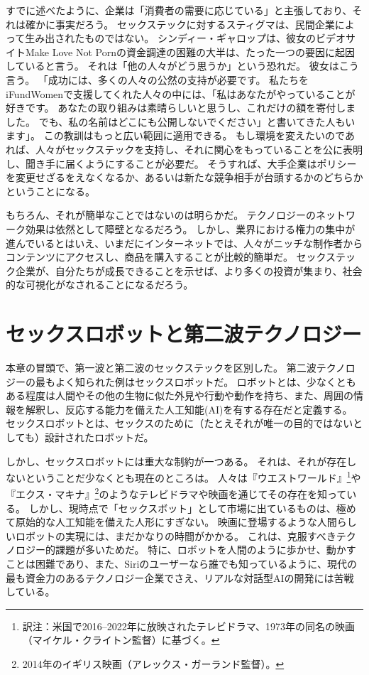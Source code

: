 \documentclass[paper=a4,book,openany]{jlreq} \usepackage{mystyle}
\begin{document}
すでに述べたように、企業は「消費者の需要に応じている」と主張しており、それは確かに事実だろう。
セックステックに対するスティグマは、民間企業によって生み出されたものではない。
シンディー・ギャロップは、彼女のビデオサイトMake Love Not Pornの資金調達の困難の大半は、たった一つの要因に起因していると言う。
それは「他の人々がどう思うか」という恐れだ。
彼女はこう言う。
「成功には、多くの人々の公然の支持が必要です。
私たちをiFundWomenで支援してくれた人々の中には、「私はあなたがやっていることが好きです。
あなたの取り組みは素晴らしいと思うし、これだけの額を寄付しました。
でも、私の名前はどこにも公開しないでください」と書いてきた人もいます」\citep{manning17:_sextec_revol_will_not_be_crowd}。
この教訓はもっと広い範囲に適用できる。
もし環境を変えたいのであれば、人々がセックステックを支持し、それに関心をもっていることを公に表明し、聞き手に届くようにすることが必要だ。
そうすれば、大手企業はポリシーを変更せざるをえなくなるか、あるいは新たな競争相手が台頭するかのどちらかということになる。

もちろん、それが簡単なことではないのは明らかだ。
テクノロジーのネットワーク効果は依然として障壁となるだろう。
しかし、業界における権力の集中が進んでいるとはいえ、いまだにインターネットでは、人々がニッチな制作者からコンテンツにアクセスし、商品を購入することが比較的簡単だ。
セックステック企業が、自分たちが成長できることを示せば、より多くの投資が集まり、社会的な可視化がなされることになるだろう。

\section{セックスロボットと第二波テクノロジー}

本章の冒頭で、第一波と第二波のセックステックを区別した。
第二波テクノロジーの最もよく知られた例はセックスロボットだ。
ロボットとは、少なくともある程度は人間やその他の生物に似た外見や行動や動作を持ち、また、周囲の情報を解釈し、反応する能力を備えた人工知能(AI)を有する存在だと定義する\citep{danaher17:_shoul_we_be_think_sex_robot}。
セックスロボットとは、セックスのために（たとえそれが唯一の目的ではないとしても）設計されたロボットだ。

しかし、セックスロボットには重大な制約が一つある。
それは、それが存在しないということだ{\DDASH}少なくとも現在のところは。
人々は『ウエストワールド』\footnote{訳注：米国で2016--2022年に放映されたテレビドラマ、1973年の同名の映画（マイケル・クライトン監督）に基づく。}や『エクス・マキナ』\footnote{2014年のイギリス映画（アレックス・ガーランド監督）。}のようなテレビドラマや映画を通じてその存在を知っている。
しかし、現時点で「セックスボット」として市場に出ているものは、極めて原始的な人工知能を備えた人形にすぎない。
映画に登場するような人間らしいロボットの実現には、まだかなりの時間がかかる。
これは、克服すべきテクノロジー的課題が多いためだ。
特に、ロボットを人間のように歩かせ、動かすことは困難であり、また、Siriのユーザーなら誰でも知っているように、現代の最も資金力のあるテクノロジー企業でさえ、リアルな対話型AIの開発には苦戦している。
\end{document}
